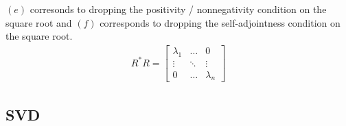 \documentclass{article}
\begin{document}
$(e)$ corresonds to dropping the positivity / nonnegativity condition on the square root and $(f)$ corresponds to dropping the self-adjointness condition on the square root.
\begin{align*}
	R^{*}R = \begin{bmatrix} \lambda_{1} & \ldots & 0 \\
	\vdots & \ddots & \vdots \\ 0 & \ldots & \lambda_{n} 
	\end{bmatrix}
\end{align*}

\begin{topic}
	\section*{SVD}
\end{topic}
\end{document}
